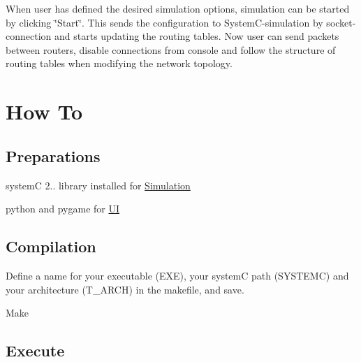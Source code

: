 When user has defined the desired simulation options, simulation can be started by clicking \char`\"{}\-Start\char`\"{}. This sends the configuration to System\-C-\/simulation by socket-\/connection and starts updating the routing tables. Now user can send packets between routers, disable connections from console and follow the structure of routing tables when modifying the network topology. \hypertarget{index_s_HowTo}{}\section{How To}\label{index_s_HowTo}
\hypertarget{index_sub_Prep}{}\subsection{Preparations}\label{index_sub_Prep}

\begin{DoxyEnumerate}
\item system\-C 2.. library installed for \hyperlink{classSimulation}{Simulation}
\item python and pygame for \hyperlink{namespaceUI}{U\-I}
\end{DoxyEnumerate}\hypertarget{index_sub_Compile}{}\subsection{Compilation}\label{index_sub_Compile}

\begin{DoxyEnumerate}
\item Define a name for your executable (E\-X\-E), your system\-C path (S\-Y\-S\-T\-E\-M\-C) and your architecture (T\-\_\-\-A\-R\-C\-H) in the makefile, and save.
\item Make
\end{DoxyEnumerate}\hypertarget{index_sub_Run}{}\subsection{Execute}\label{index_sub_Run}

